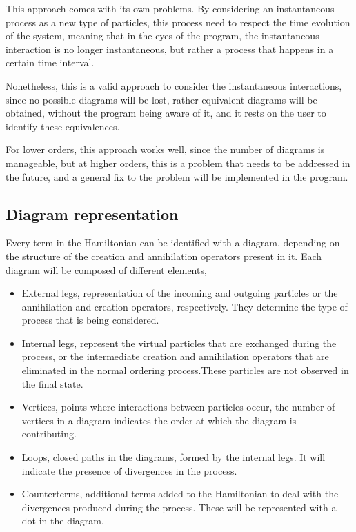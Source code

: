 \documentclass[11pt,a4paper,twoside,pdf]{article}
\numberwithin{equation}{section}
\begin{document}
This approach comes with its own problems. By considering an instantaneous 
process as a new type of particles, this process need to respect the time 
evolution of the system, meaning that in the eyes of the program, the 
instantaneous interaction is no longer instantaneous, but rather a process that
happens in a certain time interval. 

Nonetheless, this is a valid approach to consider the instantaneous interactions, 
since no possible diagrams will be lost, rather equivalent diagrams will be 
obtained, without the program being aware of it, and it rests on the user to
identify these equivalences. 

For lower orders, this approach works well, since the number of diagrams is
manageable, but at higher orders, this is a problem that needs to be addressed in 
the future, and a general fix to the problem will be implemented in the program.


\subsection{Diagram representation}

Every term in the Hamiltonian can be identified with a diagram, depending on the 
structure of the creation and annihilation operators present in it. Each diagram 
will be composed of different elements, 

\begin{itemize}
    \item External legs, representation of the incoming and outgoing particles or 
    the annihilation and creation operators, respectively. They determine the type 
    of process that is being considered.
    \item Internal legs, represent the virtual particles that are exchanged during the
    process, or the intermediate creation and annihilation operators that are 
    eliminated in the normal ordering process.These particles are not observed in 
    the final state.
    \item Vertices, points where interactions between particles occur, the number of
    vertices in a diagram indicates the order at which the diagram is contributing.
    \item Loops, closed paths in the diagrams, formed by the internal legs. It will
    indicate the presence of divergences in the process.
    \item Counterterms, additional terms added to the Hamiltonian to deal with the divergences
    produced during the process. These will be represented with a dot in the diagram.
\end{itemize}
\end{document}
